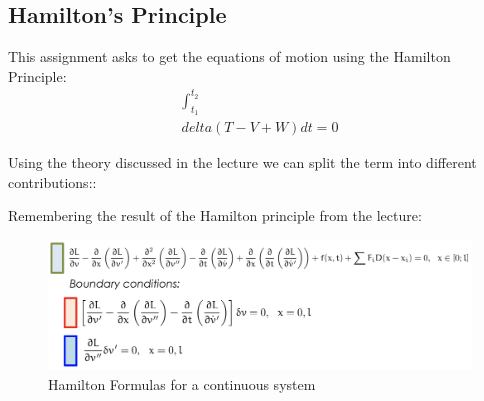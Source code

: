\subsection{Hamilton's Principle}
This assignment asks to get the equations of motion using the Hamilton Principle:
\begin{equation}
    \begin{split}
        \int_{t_1}^{t_2}\\delta (T-V+W)dt = 0
    \end{split}
\end{equation}

Using the theory discussed in the lecture we can split the term into different contributions::


Remembering the result of the Hamilton principle from the lecture:

\begin{figure}[ht]
    \centering
    \includegraphics[scale=0.2]{images/Hamilton.png}
    \caption{Hamilton Formulas for a continuous system}
    \label{fig:hamilton}
\end{figure}

